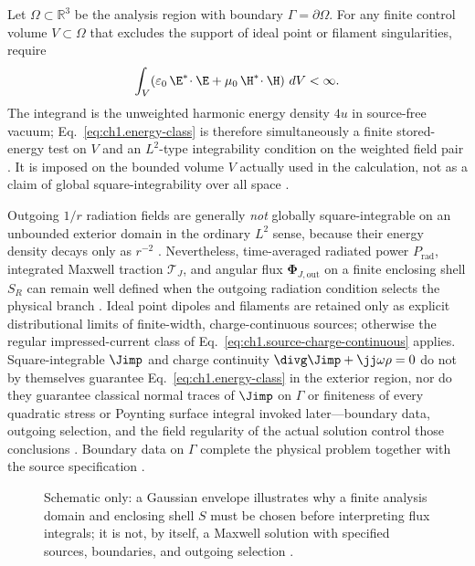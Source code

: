 Let \(\Omega\subset\mathbb{R}^{3}\) be the analysis region with boundary \(\Gamma=\partial\Omega\). For any finite control volume \(V\subset\Omega\) that excludes the support of ideal point or filament singularities, require
\begin{equation}
\label{eq:ch1.energy-class}
\int_{V}\!\left(\varepsilon_0\,\E^*\!\cdot\E+\mu_0\,\H^*\!\cdot\H\right)\,dV<\infty.
\end{equation}
The integrand is the unweighted harmonic energy density \(4u\) in source-free vacuum; Eq.~\eqref{eq:ch1.energy-class} is therefore simultaneously a finite stored-energy test on \(V\) and an \(L^2\)-type integrability condition on the weighted field pair \cite{stratton1941}. It is imposed on the bounded volume \(V\) actually used in the calculation, not as a claim of global square-integrability over all space \cite{stratton1941}.

Outgoing \(1/r\) radiation fields are generally \emph{not} globally square-integrable on an unbounded exterior domain in the ordinary \(L^2\) sense, because their energy density decays only as \(r^{-2}\) \cite{stratton1941}. Nevertheless, time-averaged radiated power \(P_{\mathrm{rad}}\), integrated Maxwell traction \(\boldsymbol{\mathcal{T}}_J\), and angular flux \(\boldsymbol{\Phi}_{J,\mathrm{out}}\) on a finite enclosing shell \(S_R\) can remain well defined when the outgoing radiation condition selects the physical branch \cite{stratton1941}. Ideal point dipoles and filaments are retained only as explicit distributional limits of finite-width, charge-continuous sources; otherwise the regular impressed-current class of Eq.~\eqref{eq:ch1.source-charge-continuous} applies. Square-integrable \(\Jimp\) and charge continuity \(\divg\Jimp+\jj\omega\rho=0\) do not by themselves guarantee Eq.~\eqref{eq:ch1.energy-class} in the exterior region, nor do they guarantee classical normal traces of \(\Jimp\) on \(\Gamma\) or finiteness of every quadratic stress or Poynting surface integral invoked later---boundary data, outgoing selection, and the field regularity of the actual solution control those conclusions \cite{stratton1941}. Boundary data on \(\Gamma\) complete the physical problem together with the source specification \cite{maxwell1873,stratton1941}.
\label{eq:ch1.admissible-space}

\begin{figure}[t]
\centering
\VolIPhysFig{\VolIPhysGaussianWaist}
\caption{Schematic only: a Gaussian envelope illustrates why a finite analysis domain and enclosing shell $S$ must be chosen before interpreting flux integrals; it is not, by itself, a Maxwell solution with specified sources, boundaries, and outgoing selection \cite{allen1992,stratton1941}.}
\label{fig:ch1.wp-gaussian-waist}
\end{figure}

